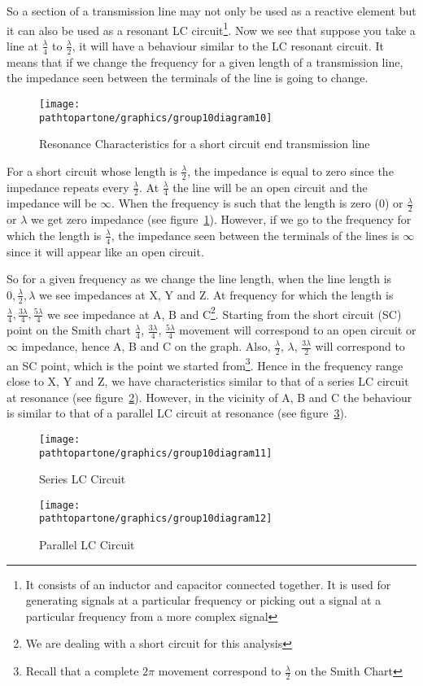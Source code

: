 So a section of a transmission line may not only be used as a reactive element but it can also be used as a resonant LC circuit\footnote{
It consists of an inductor and capacitor connected together. It is used for generating signals at a particular frequency or picking out a signal at a particular frequency from a more complex signal
}. Now we see that suppose you take a line at $ \frac{\lambda}{4} $ to $ \frac{\lambda}{2} $, it will have a behaviour similar to the LC resonant circuit. It means that if we change the frequency for a given length of a transmission line, the impedance seen between the terminals of the line is going to change.
\begin{figure}[h]
\centering
\texttt{[image: \\pathtopartone/graphics/group10diagram10]}
\caption{Resonance Characteristics for a short circuit end transmission line}
\label{fig:group10diagram11}
\end{figure}

For a short circuit whose length is $ \frac{\lambda}{2} $, the impedance is equal to zero since the impedance repeats every $\frac{\lambda}{2}$. At $ \frac{\lambda}{4} $ the line will be an open circuit and the impedance will be $\infty$. When the frequency is such that the length is zero (0) or $ \frac{\lambda}{2} $ or $ \lambda $ we get zero impedance (see figure~\ref{fig:group10diagram11}). However, if we go to the frequency for which the length is $ \frac{\lambda}{4} $, the impedance seen between the terminals of the lines is $\infty$ since it will appear like an open circuit.

So for a given frequency as we change the line length, when the line length is $ 0, \frac{\lambda}{2}, \lambda $ we see impedances at X, Y and Z. At frequency for which the length is $ \frac{\lambda}{4}, \frac{3\lambda}{4}, \frac{5\lambda}{4} $ we see impedance at A, B and C\footnote{
We are dealing with a short circuit for this analysis
}. Starting from the short circuit (SC) point on the Smith chart $ \frac{\lambda}{4} $, $ \frac{3\lambda}{4} $, $ \frac{5\lambda}{4} $ movement will correspond to an open circuit or $ \infty $ impedance, hence A, B and C on the graph. Also, $ \frac{\lambda}{2} $, $ \lambda $, $ \frac{3\lambda}{2} $ will correspond to an SC point, which is the point we started from\footnote{
Recall that a complete $ 2\pi $ movement correspond to $ \frac{\lambda}{2} $ on the Smith Chart
}. Hence in the frequency range close to X, Y and Z, we have characteristics similar to that of a series LC circuit
at resonance (see figure~\ref{fig:group10diagram12}). However, in the vicinity of A, B and C the behaviour is similar to that of a parallel LC circuit at resonance (see figure~\ref{fig:group10diagram13}). 
\begin{figure}[h]
\centering
\texttt{[image: \\pathtopartone/graphics/group10diagram11]}
\caption{Series LC Circuit}
\label{fig:group10diagram12}
\end{figure}
\begin{figure}[h]
\centering
\texttt{[image: \\pathtopartone/graphics/group10diagram12]}
\caption{Parallel LC Circuit}
\label{fig:group10diagram13}
\end{figure}

